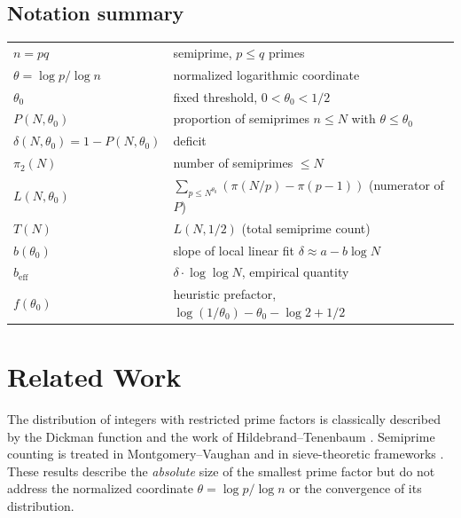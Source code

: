 \documentclass[11pt]{article}
\theoremstyle{definition}
\begin{document}
\subsection*{Notation summary}
\begin{center}
\begin{tabular}{ll}
\(n = pq\) & semiprime, \(p\le q\) primes \\
\(\theta = \log p / \log n\) & normalized logarithmic coordinate \\
\(\theta_0\) & fixed threshold, \(0<\theta_0<1/2\) \\
\(P(N,\theta_0)\) & proportion of semiprimes \(n\le N\) with \(\theta\le\theta_0\) \\
\(\delta(N,\theta_0)=1-P(N,\theta_0)\) & deficit \\
\(\pi_2(N)\) & number of semiprimes \(\le N\) \\
\(L(N,\theta_0)\) & \(\sum_{p\le N^{\theta_0}} (\pi(N/p)-\pi(p-1))\) (numerator of \(P\)) \\
\(T(N)\) & \(L(N,1/2)\) (total semiprime count) \\
\(b(\theta_0)\) & slope of local linear fit \(\delta \approx a - b\log N\) \\
\(b_{\mathrm{eff}}\) & \(\delta\cdot\log\log N\), empirical quantity \\
\(f(\theta_0)\) & heuristic prefactor, \(\log(1/\theta_0)-\theta_0-\log2+1/2\) \\
\end{tabular}
\end{center}

\section{Related Work}

The distribution of integers with restricted prime factors is classically described by
the Dickman function \cite{dickman1930} and the work of Hildebrand--Tenenbaum
\cite{hildebrand1993}.  Semiprime counting is treated in Montgomery--Vaughan
\cite{montgomery2007} and in sieve-theoretic frameworks
\cite{halberstam1974, tenenbaum1995}.  These results describe the \emph{absolute}
size of the smallest prime factor but do not address the normalized coordinate
\(\theta = \log p / \log n\) or the convergence of its distribution.
\end{document}
